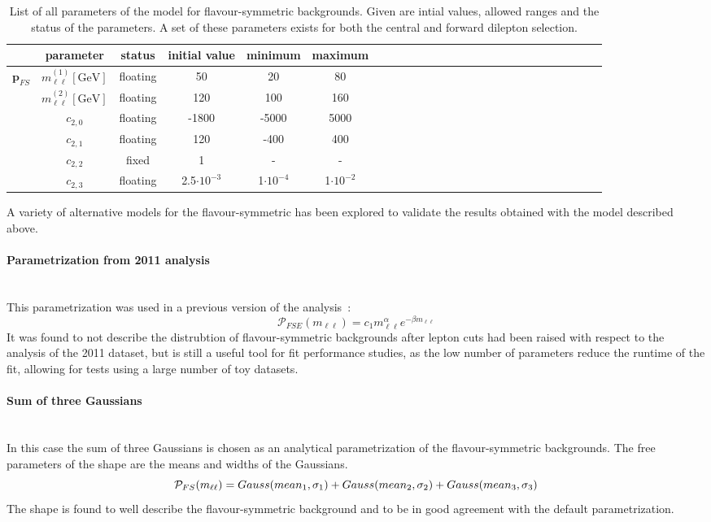 \begin{table}[htbp]
\begin{center}
 \renewcommand{\arraystretch}{1.3}
 \caption{List of all parameters of the model for flavour-symmetric backgrounds. Given are intial values, allowed ranges and the status of the parameters. A set of these parameters exists for both the central and forward dilepton selection.\label{tab:Fit_Par_Overview_FS}}
\begin{tabular}{l|c|c|c|c|ccccccccccccccccccccc}
& parameter & status & initial value & minimum & maximum \\ \hline
\multirow{5}{*}{$\mathbf{p}_{FS}$} & $m_{\ell\ell}^{(1)} [\mathrm{GeV}]$ & floating & 50 & 20 & 80 \\ 
& $m_{\ell\ell}^{(2)}  [\mathrm{GeV}]$ & floating & 120 & 100 & 160 \\
& $c_{2,0}$ & floating & -1800 & -5000 & 5000 \\ 
& $c_{2,1}$ & floating & 120 & -400 & 400 \\
& $c_{2,2}$ & fixed & 1 & - & - \\
& $c_{2,3}$ & floating & 2.5$\cdot10^{-3}$ & 1$\cdot10^{-4}$ & 1$\cdot10^{-2}$ \\
\end{tabular}

\end{center}
\end{table}

A variety of alternative models for the flavour-symmetric has been explored to validate the results obtained with the model described above. 

\paragraph{Parametrization from 2011 analysis}\mbox{} \\
This parametrization was used in a previous version of the analysis~\cite{edge2011}: 
\begin{equation*}
 \mathcal{P}_{FSE}(m_{\ell\ell}) = c_{1} m_{\ell\ell}^{\alpha} e^{-\beta m_{\ell\ell}}
\end{equation*}
It was found to not describe the distrubtion of flavour-symmetric backgrounds after lepton \pt cuts had been raised with respect to the analysis of the 2011 dataset, but is still a useful tool for fit performance studies, as the low number of parameters reduce the runtime of the fit, allowing for tests using a large number of toy datasets.
\paragraph{Sum of three Gaussians}\mbox{} \\
In this case the sum of three Gaussians is chosen as an analytical parametrization of the flavour-symmetric backgrounds. The free parameters of the shape are the means and widths of the Gaussians.
\begin{equation*}
\mathcal{P}_{FS}(m_{\ell\ell}) = Gauss(mean_1,\sigma_1) + Gauss(mean_2,\sigma_2) + Gauss(mean_3,\sigma_3)\\
\end{equation*}
The shape is found to well describe the flavour-symmetric background and to be in good agreement with the default parametrization.
